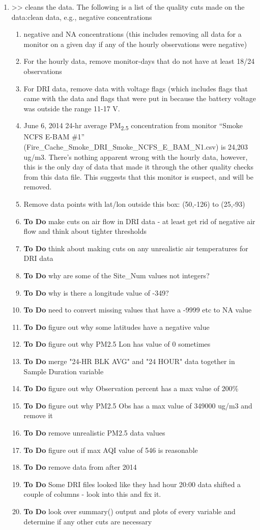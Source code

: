 \begin{enumerate}[nolistsep]
\item {} >> cleans the data. The following is a list of the quality cuts made on the data:clean data, e.g., negative concentrations
	\begin{enumerate}[nolistsep]
	\item negative and NA concentrations (this includes removing all data for a monitor on a given day if any of the hourly observations were negative)
	\item For the hourly data, remove monitor-days that do not have at least 18/24 observations
	\item For DRI data, remove data with voltage flags (which includes flags that came with the data and flags that were put in because the battery voltage was outside the range 11-17 V.
	\item June 6, 2014 24-hr average PM\textsubscript{2.5} concentration from monitor ``Smoke NCFS E-BAM \#1'' (Fire\_Cache\_Smoke\_DRI\_Smoke\_NCFS\_E\_BAM\_N1.csv) is 24,203 ug/m3. There's nothing apparent wrong with the hourly data, however, this is the only day of data that made it through the other quality checks from this data file. This suggests that this monitor is suspect, and will be removed.
	\item Remove data points with lat/lon outside this box: (50,-126) to (25,-93) 
	\item \textbf{To Do} make cuts on air flow in DRI data - at least get rid of negative air flow and think about tighter thresholds
	\item \textbf{To Do} think about making cuts on any unrealistic air temperatures for DRI data
	\item \textbf{To Do} why are some of the Site\_Num values not integers?
	\item \textbf{To Do} why is there a longitude value of -349?
	\item \textbf{To Do} need to convert missing values that have a -9999 etc to NA value
	\item \textbf{To Do} figure out why some latitudes have a negative value
	\item \textbf{To Do} figure out why PM2.5 Lon has value of 0 sometimes
	\item \textbf{To Do} merge "24-HR BLK AVG" and "24 HOUR" data together in Sample Duration variable
	\item \textbf{To Do} figure out why Observation percent has a max value of 200\%
	\item \textbf{To Do} figure out why PM2.5 Obs has a max value of 349000 ug/m3 and remove it
	\item \textbf{To Do} remove unrealistic PM2.5 data values
	\item \textbf{To Do} figure out if max AQI value of 546 is reasonable
	\item \textbf{To Do} remove data from after 2014
	\item \textbf{To Do} Some DRI files looked like they had hour 20:00 data shifted a couple of columns - look into this and fix it.
	\item \textbf{To Do} look over summary() output and plots of every variable and determine if any other cuts are necessary


\end{enumerate}
\end{enumerate}
